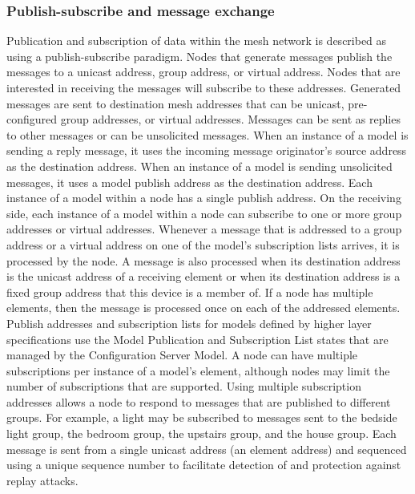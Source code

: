 \documentclass[\main/main.tex]{subfiles}
\begin{document}
\subsubsection{Publish-subscribe and message exchange}
Publication and subscription of data within the mesh network is described as using a publish-subscribe paradigm. Nodes that generate messages publish the messages to a unicast address, group address, or virtual address. Nodes that are interested in receiving the messages will subscribe to these addresses.
\newline\newline
Generated messages are sent to destination mesh addresses that can be unicast, pre-configured group addresses, or virtual addresses. Messages can be sent as replies to other messages or can be unsolicited messages. When an instance of a model is sending a reply message, it uses the incoming message originator’s source address as the destination address. When an instance of a model is sending unsolicited messages, it uses a model publish address as the destination address. Each instance of a model within a node has a single publish address.
\newline\newline
On the receiving side, each instance of a model within a node can subscribe to one or more group addresses or virtual addresses. Whenever a message that is addressed to a group address or a virtual address on one of the model’s subscription lists arrives, it is processed by the node. A message is also processed when its destination address is the unicast address of a receiving element or when its destination address is a fixed group address that this device is a member of. If a node has multiple elements, then the message is processed once on each of the addressed elements.
\newline\newline
Publish addresses and subscription lists for models defined by higher layer specifications use the Model Publication and Subscription List states that are managed by the Configuration Server Model.
\newline\newline
A node can have multiple subscriptions per instance of a model’s element, although nodes may limit the number of subscriptions that are supported. Using multiple subscription addresses allows a node to respond to messages that are published to different groups. For example, a light may be subscribed to messages sent to the bedside light group, the bedroom group, the upstairs group, and the house group.
\newline\newline
Each message is sent from a single unicast address (an element address) and sequenced using a unique sequence number to facilitate detection of and protection against replay attacks.
\end{document}

